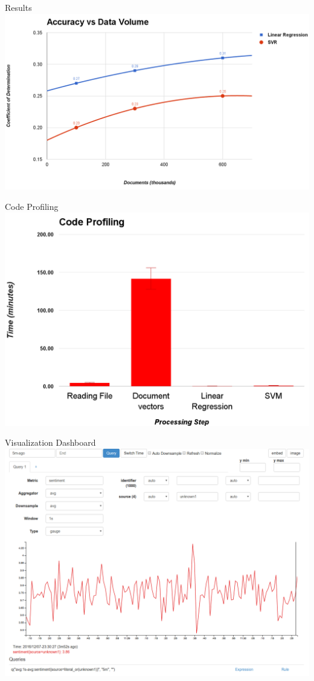 \documentclass[aspectratio=169]{beamer}
\begin{document}
\begin{frame}{Results}
	\centering
	\includegraphics[width=.9\textwidth]{images/accuracy-vs-data.png}
\end{frame}

\begin{frame}{Code Profiling}
	\centering
	\includegraphics[width=.8\textwidth]{images/code-profiling.png}
\end{frame}

\begin{frame}{Visualization Dashboard}
	\centering
	\includegraphics[width=.7\textwidth]{images/bosun-dash.png}
\end{frame}
\end{document}
